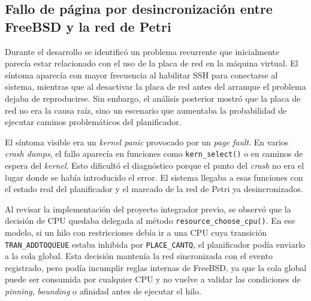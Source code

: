 



\subsection{Fallo de página por desincronización entre FreeBSD y la red de Petri}\label{ch:problema_red}

Durante el desarrollo se identificó un problema recurrente que inicialmente parecía estar relacionado con el uso de la placa de red en la máquina virtual. El síntoma aparecía con mayor frecuencia al habilitar SSH para conectarse al sistema, mientras que al desactivar la placa de red antes del arranque el problema dejaba de reproducirse. Sin embargo, el análisis posterior mostró que la placa de red no era la causa raíz, sino un escenario que aumentaba la probabilidad de ejecutar caminos problemáticos del planificador.\par

El síntoma visible era un \textit{kernel panic} provocado por un \textit{page fault}. En varios \textit{crash dumps}, el fallo aparecía en funciones como \verb|kern_select()| o en caminos de espera del \textit{kernel}. Esto dificultó el diagnóstico porque el punto del \textit{crash} no era el lugar donde se había introducido el error. El sistema llegaba a esas funciones con el estado real del planificador y el marcado de la red de Petri ya desincronizados.\par

Al revisar la implementación del proyecto integrador previo, se observó que la decisión de CPU quedaba delegada al método \verb|resource_choose_cpu()|. En ese modelo, si un hilo con restricciones debía ir a una CPU cuya transición \verb|TRAN_ADDTOQUEUE| estaba inhibida por \verb|PLACE_CANTQ|, el planificador podía enviarlo a la cola global. Esta decisión mantenía la red sincronizada con el evento registrado, pero podía incumplir reglas internas de FreeBSD, ya que la cola global puede ser consumida por cualquier CPU y no vuelve a validar las condiciones de \textit{pinning}, \textit{bounding} o afinidad antes de ejecutar el hilo.\par

